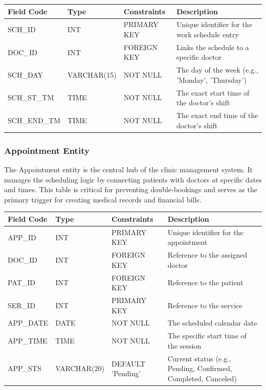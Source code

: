 \begin{table}[H]
	\centering
	\small
	\renewcommand{\arraystretch}{1.4}
	\begin{tabularx}{\textwidth}{l l l X}
		\toprule
		\rowcolor[gray]{0.9} \textbf{Field Code} & \textbf{Type} & \textbf{Constraints} & \textbf{Description} \\
		\midrule
		SCH\_ID & INT & PRIMARY KEY & Unique identifier for the work schedule entry \\
		DOC\_ID & INT & FOREIGN KEY & Links the schedule to a specific doctor \\
		SCH\_DAY & VARCHAR(15) & NOT NULL & The day of the week (e.g., 'Monday', 'Thursday') \\
		SCH\_ST\_TM & TIME & NOT NULL & The exact start time of the doctor's shift \\
		SCH\_END\_TM & TIME & NOT NULL & The exact end time of the doctor's shift \\
		\bottomrule
	\end{tabularx}
\end{table}
\subsubsection{Appointment Entity}
The Appointment entity is the central hub of the clinic management system. It manages the scheduling logic by connecting patients with doctors at specific dates and times. This table is critical for preventing double-bookings and serves as the primary trigger for creating medical records and financial bills.

\begin{table}[H]
	\centering
	\small
	\renewcommand{\arraystretch}{1.4}
	\begin{tabularx}{\textwidth}{l l l X}
		\toprule
		\rowcolor[gray]{0.9} \textbf{Field Code} & \textbf{Type} & \textbf{Constraints} & \textbf{Description} \\
		\midrule
		APP\_ID & INT & PRIMARY KEY & Unique identifier for the appointment \\
		DOC\_ID & INT & FOREIGN KEY & Reference to the assigned doctor \\
		PAT\_ID & INT & FOREIGN KEY & Reference to the patient \\
		SER\_ID & INT & PRIMARY KEY & Reference to the service \\
		APP\_DATE & DATE & NOT NULL & The scheduled calendar date \\
		APP\_TIME & TIME & NOT NULL & The specific start time of the session \\
		APP\_STS & VARCHAR(20) & DEFAULT 'Pending' & Current status (e.g., Pending, Confirmed, Completed, Canceled) \\
		\bottomrule
	\end{tabularx}
\end{table}
